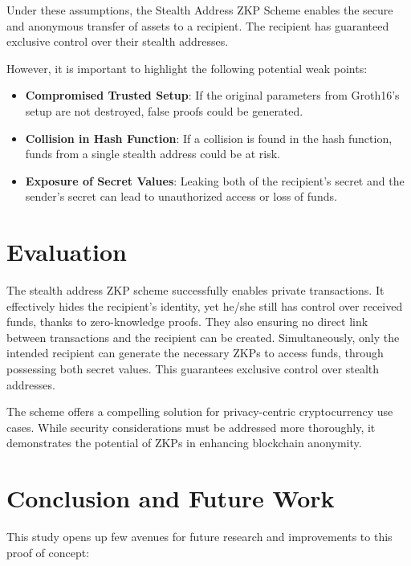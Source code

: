 \documentclass[conference,comsoc,10pt]{IEEEtran}
\begin{document}
    Under these assumptions, the Stealth Address ZKP Scheme enables the
    secure and anonymous transfer of assets to a recipient. The recipient
    has guaranteed exclusive control over their stealth addresses.

    However, it is important to highlight the following potential weak points:
    \begin{itemize}
        \item \textbf{Compromised Trusted Setup}: If the original parameters from
            Groth16's setup are not destroyed, false proofs could be generated.
        \item \textbf{Collision in Hash Function}: If a collision is found in
            the hash function, funds from a single stealth address could be at
            risk.
        \item \textbf{Exposure of Secret Values}: Leaking both of the
            recipient's secret and the sender's secret can lead to
            unauthorized access or loss of funds.
    \end{itemize}

\section{Evaluation}

    The stealth address ZKP scheme successfully enables private transactions.
    It effectively hides the recipient's identity, yet he/she still has control
    over received funds, thanks to zero-knowledge proofs. They also ensuring no
    direct link between transactions and the recipient can be created.
    Simultaneously, only the intended recipient can generate the necessary
    ZKPs to access funds, through possessing both secret values. This
    guarantees exclusive control over stealth addresses.

    The scheme offers a compelling solution for privacy-centric cryptocurrency
    use cases. While security considerations must be addressed more thoroughly, it
    demonstrates the potential of ZKPs in enhancing blockchain anonymity.

\section{Conclusion and Future Work}

    This study opens up few avenues for future research and improvements
    to this proof of concept:
\end{document}
